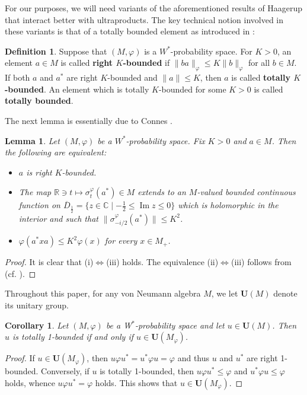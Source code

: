 \documentclass[12pt]{amsart}
\newtheorem{lem}[thm]{Lemma}
\newtheorem{cor}[thm]{Corollary}
\theoremstyle{definition}
\newtheorem{defn}[thm]{Definition}
\newcommand{\C}{\mathbb{C}}
\begin{document}
For our purposes, we will need variants of the aforementioned results of Haagerup that interact better with ultraproducts.  The key technical notion involved in these variants is that of a totally bounded element as introduced in \cite{AGHS25}:
\begin{defn}
 Suppose that $(M,\varphi)$ is a $W^*$-probability space. 
    For $K>0$, an element $a\in M$ is called \textbf{right $K$-bounded} if $\|ba\|_{\varphi}\le K\|b\|_{\varphi}$ for all $b\in M$.  If both $a$ and $a^*$ are right $K$-bounded and $\|a\|\le K$, then $a$ is called \textbf{totally $K$-bounded}. An element which is totally $K$-bounded for some $K>0$ is called \textbf{totally bounded}.    
\end{defn}
The next lemma is essentially due to Connes \cite{Connes73}. 
\begin{lem}\label{lem Kbounded}
    Let $(M,\varphi)$ be a $W^*$-probability space. Fix $K>0$ and $a\in M$. 
    Then the following are equivalent:
    \begin{itemize}
        \item[{\rm (i)}] $a$ is right $K$-bounded. 
        \item[{\rm (ii)}] The map $\mathbb{R}\ni t\mapsto \sigma_t^{\varphi}(a^*)\in M$ extends to an $M$-valued bounded continuous function on $\overline{D}_{\frac12}=\{z\in \C\mid -\frac12 \le \operatorname{Im} z\le 0\}$ which is holomorphic in the interior and such that $\|\sigma_{-i/2}^{\varphi}(a^*)\|\le K^2$.
        \item[{\rm (iii)}] $\varphi(a^*xa)\le K^2\varphi(x)$ for every $x\in M_+$.  
    \end{itemize} 
\end{lem}
\begin{proof}It is clear that (i)$\iff$(iii) holds. 
    The equivalence (ii)$\iff$(iii) follows from \cite[Lemma 4]{Connes73} (cf. \cite[Lemma VIII.3.18]{takesakiII}).  
\end{proof}

Throughout this paper, for any von Neumann algebra $M$, we let $\mathbf{U}(M)$ denote its unitary group.

\begin{cor}\label{totallyoneboundedunitary}
    Let $(M,\varphi)$ be a W$^*$-probability space and let $u\in \mathbf{U}(M)$. Then $u$ is totally 1-bounded if and only if $u\in \mathbf{U}(M_{\varphi})$.
\end{cor}
\begin{proof}
    If $u\in \mathbf{U}(M_{\varphi})$, then $u\varphi u^*=u^*\varphi u=\varphi$ and thus $u$ and $u^*$ are right 1-bounded.  
    Conversely, if $u$ is totally 1-bounded, then $u\varphi u^*\le \varphi$ and $u^*\varphi u\le \varphi$ holds, whence $u\varphi u^*=\varphi$ holds. This shows that $u\in \mathbf{U}(M_{\varphi})$. 
\end{proof}
\end{document}
